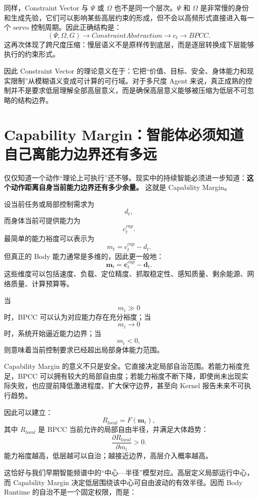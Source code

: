 同样，Constraint Vector 与 $\Psi$ 或 $\Omega$ 也不是同一个层次。$\Psi$ 和 $\Omega$ 是非常慢的身份和生成先验，它们可以影响某些高层约束的形成，但不会以高频形式直接进入每一个 servo 控制周期。因此正确结构是：
\[
(\Psi,\Omega,G)
\rightarrow
ConstraintAbstraction
\rightarrow
c_t
\rightarrow
BPCC.
\]
这再次体现了跨尺度压缩：慢层语义不是原样传到底层，而是逐层转换成下层能够执行的约束形式。

因此 Constraint Vector 的理论意义在于：它把“价值、目标、安全、身体能力和现实限制”从模糊语义变成可计算的可行域。对于多尺度 Agent 来说，真正成熟的控制并不是要求低层理解全部高层意义，而是确保高层意义能够被压缩为低层不可忽略的结构边界。

\section{Capability Margin：智能体必须知道自己离能力边界还有多远}

仅仅知道一个动作“理论上可执行”还不够。现实中的持续智能必须进一步知道：\textbf{这个动作距离自身当前能力边界还有多少余量。} 这就是 Capability Margin。

设当前任务或局部控制需求为
\[
d_t,
\]
而身体当前可提供能力为
\[
c_t^{cap}.
\]
最简单的能力裕度可以表示为
\[
m_t
=
c_t^{cap}
-
d_t.
\]
但真正的 Body 能力通常是多维的，因此更一般地：
\[
\mathbf m_t
=
\mathbf c_t^{cap}
-
\mathbf d_t.
\]
这些维度可以包括速度、负载、定位精度、抓取稳定性、感知质量、剩余能源、网络质量、计算预算等。

当
\[
m_i\gg0
\]
时，BPCC 可以认为对应能力存在充分裕度；当
\[
m_i\rightarrow0
\]
时，系统开始逼近能力边界；当
\[
m_i<0,
\]
则意味着当前控制要求已经超出局部身体能力范围。

Capability Margin 的意义不只是安全。它直接决定局部自治范围。若能力裕度充足，BPCC 可以拥有较大的局部自由度；若能力裕度不断下降，即使尚未出现实际失败，也应提前降低激进程度、扩大保守边界，甚至向 Kernel 报告未来不可执行趋势。

因此可以建立：
\[
R_{local}
=
F(\mathbf m_t),
\]
其中 $R_{local}$ 是 BPCC 当前允许的局部自由半径，并满足大体趋势：
\[
\frac{\partial R_{local}}
{\partial m_i}
>0.
\]
能力裕度越高，低层越可以自治；越接近边界，高层介入概率越高。

这恰好与我们早期智能频谱中的“中心—半径”模型对应。高层定义局部运行中心，而 Capability Margin 决定低层围绕该中心可自由波动的有效半径。因而 Body Runtime 的自治不是一个固定权限，而是：
\begin{statementbox}
\centering
{}
\end{statementbox}

